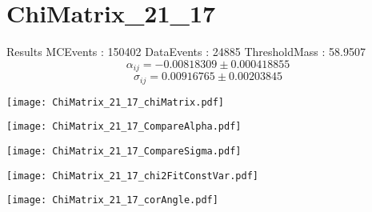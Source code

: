 \documentclass[a4paper,12pt]{article}
\begin{document}
\section{ChiMatrix\_21\_17}
\begin{minipage}{0.49\linewidth} Results \newline
MCEvents : 150402\newline
DataEvents : 24885 \newline
ThresholdMass : 58.9507\\
$$\alpha_{ij} = -0.00818309\pm 0.000418855$$
$$\sigma_{ij} = 0.00916765\pm 0.00203845$$
\end{minipage}\hfill
\begin{minipage}{0.49\linewidth} 
\texttt{[image: ChiMatrix\_21\_17\_chiMatrix.pdf]}\\
\end{minipage}
\hfill
\begin{minipage}{0.49\linewidth} 
\texttt{[image: ChiMatrix\_21\_17\_CompareAlpha.pdf]}\\
\end{minipage}
\hfill
\begin{minipage}{0.49\linewidth} 
\texttt{[image: ChiMatrix\_21\_17\_CompareSigma.pdf]}\\
\end{minipage}
\begin{minipage}{0.49\linewidth} 
\texttt{[image: ChiMatrix\_21\_17\_chi2FitConstVar.pdf]}\\
\end{minipage}
\hfill
\begin{minipage}{0.49\linewidth} 
\texttt{[image: ChiMatrix\_21\_17\_corAngle.pdf]}\\
\end{minipage}
\end{document}
